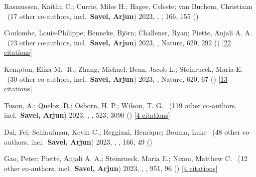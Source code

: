 \item[{\color{numcolor}\scriptsize28}] Rasmussen, Kaitlin C.; Currie, Miles H.; Hagee, Celeste; van Buchem, Christiaan \etal\ ({17} other co-authors, incl.\ \textbf{Savel, Arjun}) 2023, , \aj, {166}, 155 ()

\item[{\color{numcolor}\scriptsize27}] Coulombe, Louis-Philippe; Benneke, Bj{\"o}rn; Challener, Ryan; Piette, Anjali A. A. \etal\ ({73} other co-authors, incl.\ \textbf{Savel, Arjun}) 2023, , Nature, {620}, 292 () [\href{https://ui.adsabs.harvard.edu/abs/2023Natur.620..292C}{22 citations}]

\item[{\color{numcolor}\scriptsize26}] Kempton, Eliza M. -R.; Zhang, Michael; Bean, Jacob L.; Steinrueck, Maria E. \etal\ ({30} other co-authors, incl.\ \textbf{Savel, Arjun}) 2023, , Nature, {620}, 67 () [\href{https://ui.adsabs.harvard.edu/abs/2023Natur.620...67K}{13 citations}]

\item[{\color{numcolor}\scriptsize25}] Tuson, A.; Queloz, D.; Osborn, H. P.; Wilson, T. G. \etal\ ({119} other co-authors, incl.\ \textbf{Savel, Arjun}) 2023, , \mnras, {523}, 3090 () [\href{https://ui.adsabs.harvard.edu/abs/2023MNRAS.523.3090T}{4 citations}]

\item[{\color{numcolor}\scriptsize24}] Dai, Fei; Schlaufman, Kevin C.; Reggiani, Henrique; Bouma, Luke \etal\ ({48} other co-authors, incl.\ \textbf{Savel, Arjun}) 2023, , \aj, {166}, 49 ()

\item[{\color{numcolor}\scriptsize23}] Gao, Peter; Piette, Anjali A. A.; Steinrueck, Maria E.; Nixon, Matthew C. \etal\ ({12} other co-authors, incl.\ \textbf{Savel, Arjun}) 2023, , \apj, {951}, 96 () [\href{https://ui.adsabs.harvard.edu/abs/2023ApJ...951...96G}{4 citations}]

